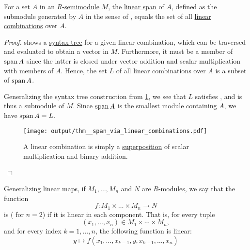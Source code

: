 \begin{proposition}\label{thm:span_via_linear_combinations}
  For a set \( A \) in an \( R \)-\hyperref[def:semimodule]{semimodule} \( M \), the \hyperref[def:semimodule/submodel]{linear span} of \( A \), defined as the submodule generated by \( A \) in the sense of , equals the set of all \hyperref[def:linear_combination]{linear combinations} over \( A \).
\end{proposition}
\begin{proof}
   shows a \hyperref[def:grammar_syntax_tree]{syntax tree} for a given linear combination, which can be traversed and evaluated to obtain a vector in \( M \). Furthermore, it must be a member of \( \operatorname{span} A \) since the latter is closed under vector addition and scalar multiplication with members of \( A \). Hence, the set \( L \) of all linear combinations over \( A \) is a subset of \( \operatorname{span} A \).

  Generalizing the syntax tree construction from \cref{fig:thm:span_via_linear_combinations}, we see that \( L \) satisfies , and is thus a submodule of \( M \). Since \( \operatorname{span} A \) is the smallest module containing \( A \), we have \( \operatorname{span} A = L \).

  \begin{figure}[h]
    \hfill
    \texttt{[image: output/thm\_\_span\_via\_linear\_combinations.pdf]}
    \hfill\hfill
    \caption{A linear combination is simply a \hyperref[def:multi_valued_function/superposition]{superposition} of scalar multiplication and binary addition.}
    \label{fig:thm:span_via_linear_combinations}
  \end{figure}
\end{proof}

\begin{definition}\label{def:multilinear_function}\mimprovised
  Generalizing \hyperref[def:semimodule/homomorphism]{linear maps}, if \( M_1, \ldots, M_n \) and \( N \) are \( R \)-modules, we say that the function
  \begin{equation*}
    f: M_1 \times \ldots \times M_n \to N
  \end{equation*}
  is  ( for \( n = 2 \)) if it is linear in each component. That is, for every tuple
  \begin{equation*}
    (x_1, \ldots, x_n) \in M_1 \times \cdots \times M_n,
  \end{equation*}
  and for every index \( k = 1, \ldots, n \), the following function is linear:
  \begin{equation*}
    y \mapsto f(x_1, \ldots, x_{k-1}, y, x_{k+1}, \ldots, x_n)
  \end{equation*}
\end{definition}

